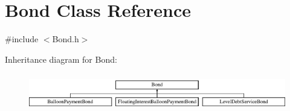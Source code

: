 \hypertarget{classBond}{}\section{Bond Class Reference}
\label{classBond}


{\ttfamily \#include $<$Bond.\+h$>$}

Inheritance diagram for Bond\+:\begin{figure}[H]
\begin{center}
\leavevmode
\includegraphics[height=1.659259cm]{classBond}
\end{center}
\end{figure}
